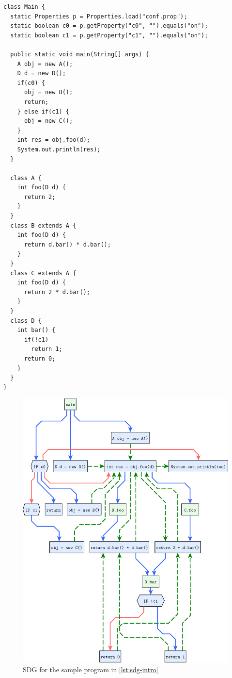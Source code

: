 \begin{lstlisting}[float=hpb,label=lst:sdg-intro,
  caption={Configurable program using load-time variability which results in the SDG in \autoref{fig:sdg-intro}}]
class Main {
  static Properties p = Properties.load("conf.prop");
  static boolean c0 = p.getProperty("c0", "").equals("on");
  static boolean c1 = p.getProperty("c1", "").equals("on");
  
  public static void main(String[] args) {
    A obj = new A();
    D d = new D();
    if(c0) {
      obj = new B();
      return;
    } else if(c1) {
      obj = new C();
    }
    int res = obj.foo(d);
    System.out.println(res);
  }
  
  class A {
    int foo(D d) {
      return 2;
    }
  }
  class B extends A {
    int foo(D d) {
      return d.bar() * d.bar();
    }
  }
  class C extends A {
    int foo(D d) {
      return 2 * d.bar();
    }
  }
  class D {
    int bar() {
      if(!c1)
        return 1;
      return 0;
    }
  }
}
\end{lstlisting}

\begin{figure}[hpb]
  \centering
    \includegraphics[scale=0.6]{sdgs/intro}
  \caption{SDG for the sample program in \autoref{lst:sdg-intro}}
  \label{fig:sdg-intro}
\end{figure}
